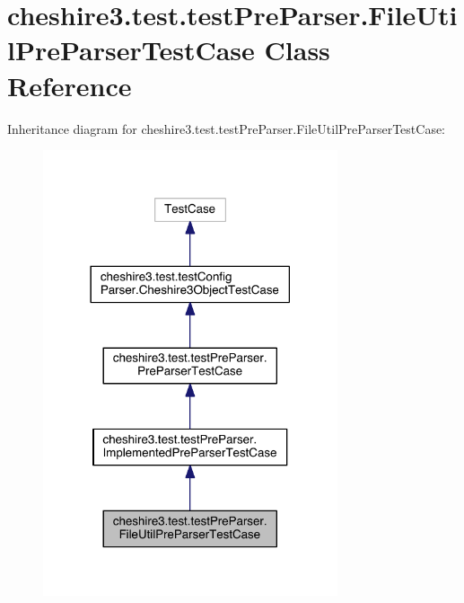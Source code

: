 \hypertarget{classcheshire3_1_1test_1_1test_pre_parser_1_1_file_util_pre_parser_test_case}{\section{cheshire3.\-test.\-test\-Pre\-Parser.\-File\-Util\-Pre\-Parser\-Test\-Case Class Reference}
\label{classcheshire3_1_1test_1_1test_pre_parser_1_1_file_util_pre_parser_test_case}
}


Inheritance diagram for cheshire3.\-test.\-test\-Pre\-Parser.\-File\-Util\-Pre\-Parser\-Test\-Case\-:
\nopagebreak
\begin{figure}[H]
\begin{center}
\leavevmode
\includegraphics[width=246pt]{classcheshire3_1_1test_1_1test_pre_parser_1_1_file_util_pre_parser_test_case__inherit__graph}
\end{center}
\end{figure}


